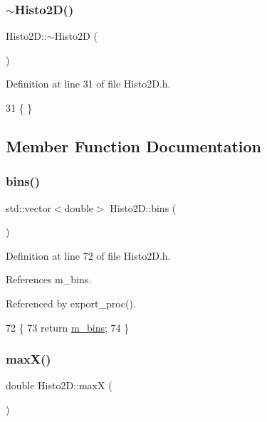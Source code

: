 \subsubsection{\texorpdfstring{$\sim$\+Histo2\+D()}{~Histo2D()}}
{\footnotesize\ttfamily Histo2\+D\+::$\sim$\+Histo2D (\begin{DoxyParamCaption}{ }\end{DoxyParamCaption})\hspace{0.3cm}{\ttfamily [inline]}}



Definition at line 31 of file Histo2\+D.\+h.


\begin{DoxyCode}
31 \{ \}
\end{DoxyCode}


\subsection{Member Function Documentation}
\mbox{\label{classHisto2D_ab3d44a1cb12119a2244065af2b1f7099}} 
\subsubsection{\texorpdfstring{bins()}{bins()}}
{\footnotesize\ttfamily std\+::vector$<$double$>$ Histo2\+D\+::bins (\begin{DoxyParamCaption}{ }\end{DoxyParamCaption})\hspace{0.3cm}{\ttfamily [inline]}}



Definition at line 72 of file Histo2\+D.\+h.



References m\+\_\+bins.



Referenced by export\+\_\+proc().


\begin{DoxyCode}
72                           \{  
73     \textcolor{keywordflow}{return} \hyperlink{classHisto2D_a84f6c03673499f34b981cdebf69d22aa}{m\_bins};
74   \}
\end{DoxyCode}
\mbox{\label{classHisto2D_aae04c13ac492562532b4d3f82979a0f4}} 
\subsubsection{\texorpdfstring{max\+X()}{maxX()}}
{\footnotesize\ttfamily double Histo2\+D\+::maxX (\begin{DoxyParamCaption}{ }\end{DoxyParamCaption})\hspace{0.3cm}{\ttfamily [inline]}}



